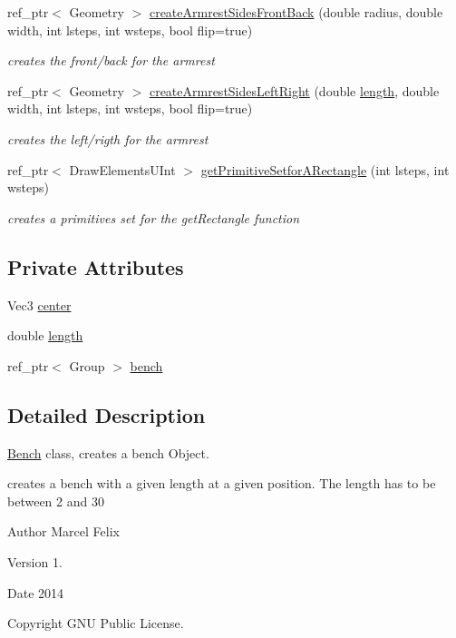 \begin{DoxyCompactItemize}
ref\+\_\+ptr$<$ Geometry $>$ \hyperlink{classbrtr_1_1_bench_a28443b856188050680a2c0ab4ad31a93}{create\+Armrest\+Sides\+Front\+Back} (double radius, double width, int lsteps, int wsteps, bool flip=true)
\begin{DoxyCompactList}\small\item\em creates the front/back for the armrest \end{DoxyCompactList}\item 
ref\+\_\+ptr$<$ Geometry $>$ \hyperlink{classbrtr_1_1_bench_afac56bea39f6e5e72140d4512dd711d3}{create\+Armrest\+Sides\+Left\+Right} (double \hyperlink{classbrtr_1_1_bench_a81188a60871201d741c288396430964d}{length}, double width, int lsteps, int wsteps, bool flip=true)
\begin{DoxyCompactList}\small\item\em creates the left/rigth for the armrest \end{DoxyCompactList}\item 
ref\+\_\+ptr$<$ Draw\+Elements\+U\+Int $>$ \hyperlink{classbrtr_1_1_bench_a90c4ae616eb8d7bf669af2983ed3cd1d}{get\+Primitive\+Setfor\+A\+Rectangle} (int lsteps, int wsteps)
\begin{DoxyCompactList}\small\item\em creates a primitives set for the get\+Rectangle function \end{DoxyCompactList}\end{DoxyCompactItemize}
\subsection*{Private Attributes}
\begin{DoxyCompactItemize}
\item 
Vec3 \hyperlink{classbrtr_1_1_bench_a5ea108ad6ee96d487ac00ecacc383aa2}{center}
\item 
double \hyperlink{classbrtr_1_1_bench_a81188a60871201d741c288396430964d}{length}
\item 
ref\+\_\+ptr$<$ Group $>$ \hyperlink{classbrtr_1_1_bench_aa3da8798872d1c2d595c24a48a5cb427}{bench}
\end{DoxyCompactItemize}


\subsection{Detailed Description}
\hyperlink{classbrtr_1_1_bench}{Bench} class, creates a bench Object. 

creates a bench with a given length at a given position. The length has to be between 2 and 30 \begin{DoxyAuthor}{Author}
Marcel Felix 
\end{DoxyAuthor}
\begin{DoxyVersion}{Version}
1. 
\end{DoxyVersion}
\begin{DoxyDate}{Date}
2014
\end{DoxyDate}
\begin{DoxyCopyright}{Copyright}
G\+N\+U Public License. 
\end{DoxyCopyright}


